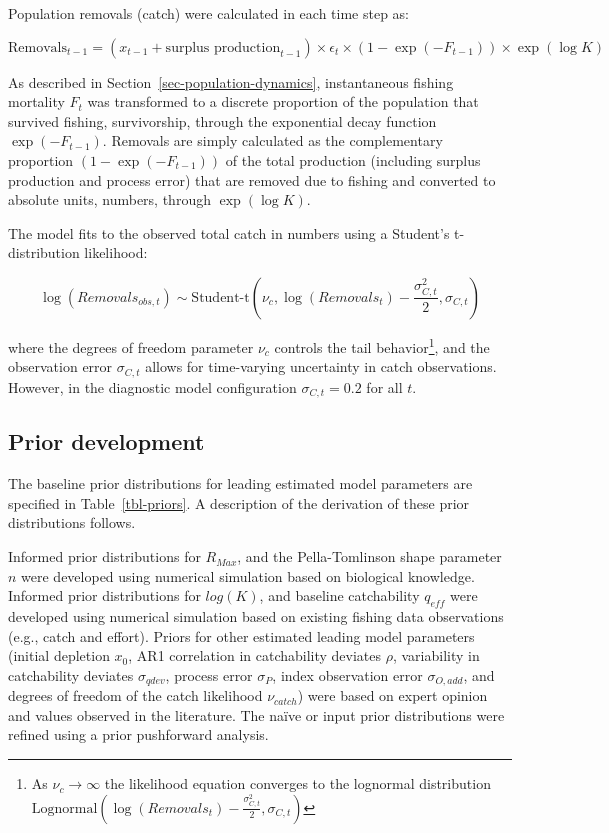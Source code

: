 \documentclass[
  11pt,
]{SCreport}
\begin{document}
Population removals (catch) were calculated in each time step as:

\[\text{Removals}_{t-1} = \left(x_{t-1} + \text{surplus production}_{t-1}\right) \times \epsilon_t \times \left(1 - \exp(-F_{t-1})\right) \times \exp(\log K)\]

As described in Section~\ref{sec-population-dynamics}, instantaneous
fishing mortality \(F_t\) was transformed to a discrete proportion of
the population that survived fishing, survivorship, through the
exponential decay function \(\exp(-F_{t-1})\). Removals are simply
calculated as the complementary proportion
\(\left(1 - \exp(-F_{t-1})\right)\) of the total production (including
surplus production and process error) that are removed due to fishing
and converted to absolute units, numbers, through \(\exp(\log K)\).

The model fits to the observed total catch in numbers using a Student's
t-distribution likelihood:

\[\log(Removals_{obs,t}) \sim \text{Student-t}\left(\nu_c, \log(Removals_t) - \frac{\sigma_{C,t}^2}{2}, \sigma_{C,t}\right)\]

where the degrees of freedom parameter \(\nu_c\) controls the tail
behavior\footnote{As \(\nu_c \to \infty\) the likelihood equation
  converges to the lognormal distribution
  \(\text{Lognormal}\left(\log(Removals_t) - \frac{\sigma_{C,t}^2}{2}, \sigma_{C,t}\right)\)},
and the observation error \(\sigma_{C,t}\) allows for time-varying
uncertainty in catch observations. However, in the diagnostic model
configuration \(\sigma_{C,t} = 0.2\) for all \(t\).

\subsection{Prior development}\label{sec-prior-development}

The baseline prior distributions for leading estimated model parameters
are specified in Table~\ref{tbl-priors}. A description of the derivation
of these prior distributions follows.

Informed prior distributions for \(R_{Max}\), and the Pella-Tomlinson
shape parameter \(n\) were developed using numerical simulation based on
biological knowledge. Informed prior distributions for \(log(K)\), and
baseline catchability \(q_{eff}\) were developed using numerical
simulation based on existing fishing data observations (e.g., catch and
effort). Priors for other estimated leading model parameters (initial
depletion \(x_0\), AR1 correlation in catchability deviates \(\rho\),
variability in catchability deviates \(\sigma_{qdev}\), process error
\(\sigma_P\), index observation error \(\sigma_{O,add}\), and degrees of
freedom of the catch likelihood \(\nu_{catch}\)) were based on expert
opinion and values observed in the literature. The naïve or input prior
distributions were refined using a prior pushforward analysis.
\end{document}
